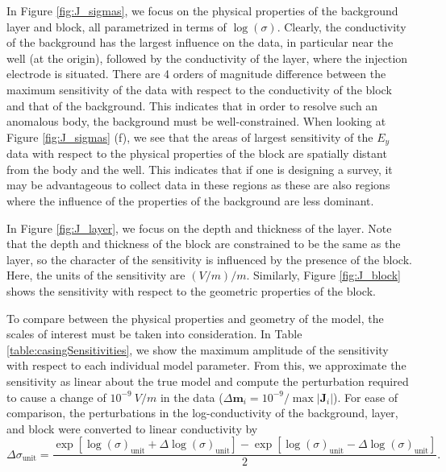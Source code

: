 \documentclass[preprint,review,3p,times,onecolumn,authoryear]{elsarticle}
\begin{document}
In Figure \ref{fig:J_sigmas}, we focus on the physical properties of the
background layer and block, all parametrized in terms of $\log(\sigma)$.
Clearly, the conductivity of the background has the largest influence on the
data, in particular near the well (at the origin), followed by the
conductivity of the layer, where the injection electrode is situated. There
are 4 orders of magnitude difference between the maximum sensitivity of the data with
respect to the conductivity of the block and that of the background. This
indicates that in order to resolve such an anomalous body, the background
must be well-constrained. When looking at Figure \ref{fig:J_sigmas} (f), we
see that the areas of largest sensitivity of the $E_y$ data with respect to the
physical properties of the block are spatially distant from the body and the
well. This  indicates that if one is designing a survey, it may be advantageous to
collect data in these regions as these are also regions where the influence of the properties
of the background are less dominant.

In Figure \ref{fig:J_layer}, we focus on the depth and thickness of the layer.
Note that the depth and thickness of the block are constrained to be the same
as the layer, so the character of the sensitivity is influenced by the
presence of the block. Here, the units of the sensitivity are $(V/m) / m$.
Similarly, Figure \ref{fig:J_block} shows the sensitivity with respect to the
geometric properties of the block.

To compare between the physical properties and geometry of the model, the
scales of interest must be taken into consideration. In Table
\ref{table:casingSensitivities}, we show the maximum amplitude of the
sensitivity with respect to each individual model parameter. From this, we
approximate the sensitivity as linear about the true model and compute the
perturbation required to cause a change of $10^{-9}~V/m$ in the data
($\Delta \mathbf{m}_i = 10^{-9} / \max|\mathbf{J}_i|$). For ease
of comparison, the perturbations in the log-conductivity of the background,
layer, and block were converted to linear conductivity by
\begin{equation}
    \Delta \sigma_{\text{unit}} = \frac{\exp[\log(\sigma)_\text{unit} + \Delta\log(\sigma)_\text{unit}] -
                                        \exp[\log(\sigma)_\text{unit} - \Delta\log(\sigma)_\text{unit}]}{2}.
\label{eq:log2linear}
\end{equation}
\end{document}
